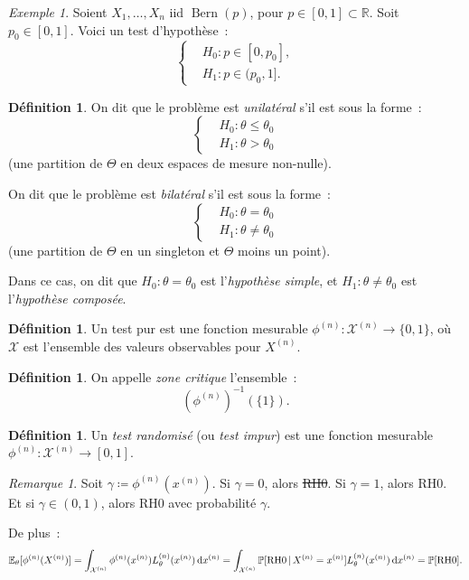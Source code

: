 \documentclass{report}
\DeclareMathOperator{\Bern}{Bern}  %
\renewcommand{\P}{\mathbb P}
\newcommand{\E}{\mathbb E}
\newcommand{\R}{\mathbb R}
\newcommand{\n}{{(n)}}
\theoremstyle{definition}
\newtheorem{déf}[thm]{Définition}
\theoremstyle{remark}
\newtheorem*{rmq}{Remarque}
\newtheorem{ex}{Exemple}[chapter]
\begin{document}
	\begin{ex} Soient $X_1, \ldots, X_n$ iid $\Bern(p)$, pour $p \in [0, 1] \subset \R$. Soit $p_0 \in [0, 1]$. Voici un test d'hypothèse~:
	\[\begin{cases}
		&H_0 : p \in [0, p_0], \\
		&H_1 : p \in (p_0, 1].
	\end{cases}\]
	\end{ex}

	\begin{déf} On dit que le problème est \textit{unilatéral} s'il est sous la forme~:
	\[\begin{cases}
		&H_0 : \theta \leq \theta_0 \\
		&H_1 : \theta > \theta_0
	\end{cases}\]
	(une partition de $\Theta$ en deux espaces de mesure non-nulle).

	On dit que le problème est \textit{bilatéral} s'il est sous la forme~:
	\[\begin{cases}
		&H_0 : \theta = \theta_0 \\
		&H_1 : \theta \neq \theta_0
	\end{cases}\]
	(une partition de $\Theta$ en un singleton et $\Theta$ moins un point).

	Dans ce cas, on dit que $H_0 : \theta = \theta_0$ est l'\textit{hypothèse simple}, et $H_1 : \theta \neq \theta_0$ est l'\textit{hypothèse composée}.
	\end{déf}

	\begin{déf} Un test pur est une fonction mesurable $\phi^\n : \mathcal X^\n \to \{0, 1\}$, où $\mathcal X$ est l'ensemble des valeurs observables pour $X^\n$.
	\end{déf}

	\begin{déf} On appelle \textit{zone critique} l'ensemble~:
	\[\left(\phi^\n\right)^{-1}\left(\{1\}\right).\]
	\end{déf}

	\begin{déf} Un \textit{test randomisé} (ou \textit{test impur}) est une fonction mesurable $\phi^\n : \mathcal X^\n \to [0, 1]$.
	\end{déf}

	\begin{rmq} Soit $\gamma \coloneqq \phi^\n(x^\n)$. Si $\gamma = 0$, alors \sout {RH0}. Si $\gamma = 1$, alors RH0. Et si $\gamma \in (0, 1)$, alors
	RH0 avec probabilité $\gamma$.

	De plus~:
	\[\E_\theta[\phi^\n(X^\n)] = \int_{\mathcal X^\n}\phi^\n(x^\n)L_\theta^\n(x^\n)\dif x^\n
		= \int_{\mathcal X^\n}\P[\text{RH0} \, | \, X^\n = x^\n]L_\theta^\n(x^\n)\dif x^\n
		= \P[\text{RH0}].\]
	\end{rmq}
\end{document}
